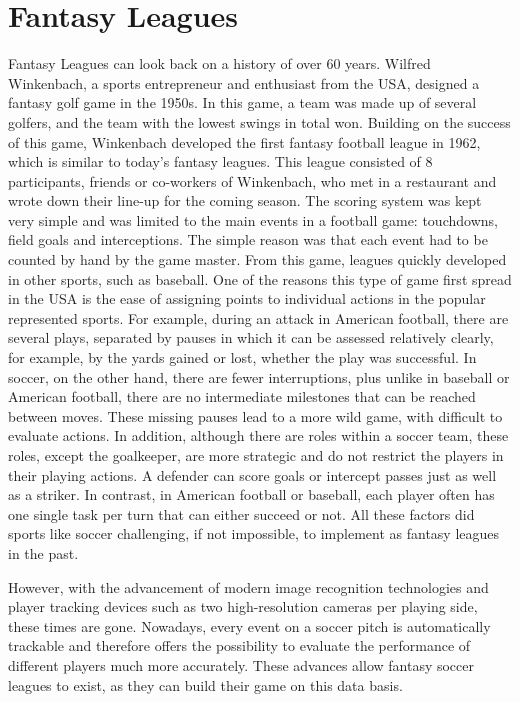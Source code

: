 \section{Fantasy Leagues}

Fantasy Leagues can look back on a history of over 60 years. Wilfred Winkenbach, a sports entrepreneur and enthusiast from the USA, designed a fantasy golf game in the 1950s. In this game, a team was made up of several golfers, and the team with the lowest swings in total won. Building on the success of this game, Winkenbach developed the first fantasy football league in 1962, which is similar to today's fantasy leagues. \parencite[cf.][]{green_wink_2014} This league consisted of 8 participants, friends or co-workers of Winkenbach, who met in a restaurant and wrote down their line-up for the coming season. The scoring system was kept very simple and was limited to the main events in a football game: touchdowns, field goals and interceptions. The simple reason was that each event had to be counted by hand by the game master. \parencite[cf.][]{fabiano_fantasy_2007} From this game, leagues quickly developed in other sports, such as baseball. One of the reasons this type of game first spread in the USA is the ease of assigning points to individual actions in the popular represented sports. For example, during an attack in American football, there are several plays, separated by pauses in which it can be assessed relatively clearly, for example, by the yards gained or lost, whether the play was successful. In soccer, on the other hand, there are fewer interruptions, plus unlike in baseball or American football, there are no intermediate milestones that can be reached between moves. These missing pauses lead to a more wild game, with difficult to evaluate actions. In addition, although there are roles within a soccer team, these roles, except the goalkeeper, are more strategic and do not restrict the players in their playing actions. A defender can score goals or intercept passes just as well as a striker. In contrast, in American football or baseball, each player often has one single task per turn that can either succeed or not. All these factors did sports like soccer challenging, if not impossible, to implement as fantasy leagues in the past.

However, with the advancement of modern image recognition technologies and player tracking devices such as two high-resolution cameras per playing side, these times are gone. \parencite[cf.][]{hoffmann_millionen_2014} Nowadays, every event on a soccer pitch is automatically trackable and therefore offers the possibility to evaluate the performance of different players much more accurately. These advances allow fantasy soccer leagues to exist, as they can build their game on this data basis.

